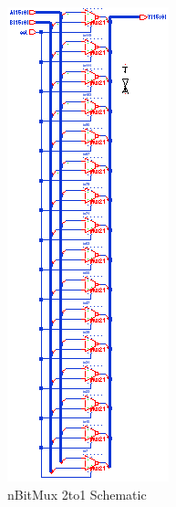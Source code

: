 \documentclass[11pt]{article}
\begin{document}
	
	\begin{figure}[H] 
		\centering 
		\includegraphics[width=0.7\linewidth]{"Pictures/nBitMux_2to1 Schematic"}
		\caption{nBitMux 2to1 Schematic} 
		\label{fig:nBitMux-2to1-Schematic} 
	\end{figure}
	
\end{document}
